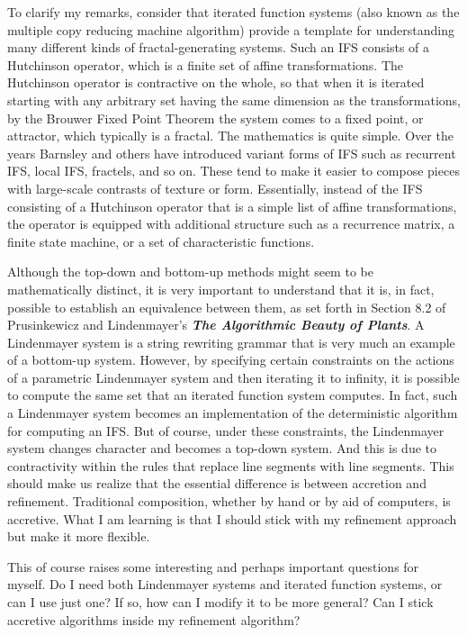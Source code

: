 \documentclass[english,11pt,letterpaper,onecolumn]{scrartcl}
\numberwithin{equation}{section}
\begin{document}
To clarify my remarks, consider that iterated function systems (also known as the multiple copy reducing machine algorithm) provide a template for understanding many different kinds of fractal-generating systems. Such an IFS consists of a Hutchinson operator, which is a finite set of affine transformations. The Hutchinson operator is contractive on the whole, so that when it is iterated starting with any arbitrary set having the same dimension as the transformations, by the Brouwer Fixed Point Theorem the system comes to a fixed point, or attractor, which typically is a fractal. The mathematics is quite simple. Over the years Barnsley and others have introduced variant forms of IFS such as recurrent IFS, local IFS, fractels, and so on. These tend to make it easier to compose pieces with large-scale contrasts of texture or form. Essentially, instead of the IFS consisting of a Hutchinson operator that is a simple list of affine transformations, the operator is equipped with additional structure such as a recurrence matrix, a finite state machine, or a set of characteristic functions.

Although the top-down and bottom-up methods might seem to be mathematically distinct, it is very important to understand that it is, in fact, possible to establish an equivalence between them, as set forth in Section 8.2 of Prusinkewicz and Lindenmayer's \textit{\textbf{The Algorithmic Beauty of Plants}}. A Lindenmayer system is a string rewriting grammar that is very much an example of a bottom-up system. However, by specifying certain constraints on the actions of a parametric Lindenmayer system and then iterating it to infinity, it is possible to compute the same set that an iterated function system computes. In fact, such a Lindenmayer system becomes an implementation of the deterministic algorithm for computing an IFS. But of course, under these constraints, the Lindenmayer system changes character and becomes a top-down system. And this is due to contractivity within the rules that replace line segments with line segments. This should make us realize that the essential difference is between accretion and refinement. Traditional composition, whether by hand or by aid of computers, is accretive. What I am learning is that I should stick with my refinement approach but make it more flexible.

This of course raises some interesting and perhaps important questions for myself. Do I need both Lindenmayer systems and iterated function systems, or can I use just one? If so, how can I modify it to be more general? Can I stick accretive algorithms inside my refinement algorithm?





\printbibliography
\end{document}
